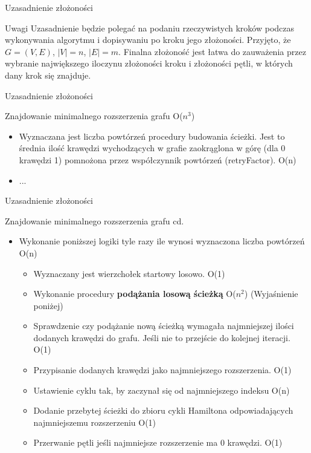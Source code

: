 \documentclass{beamer}
\begin{document}
\begin{frame}{Uzasadnienie złożoności}
\begin{block}{Uwagi}
\justifying
Uzasadnienie będzie polegać na podaniu rzeczywistych kroków podczas wykonywania algorytmu i dopisywaniu po kroku jego złożoności. Przyjęto, że $G = (V,E)$, $|V| = n$, $|E| = m$.
Finalna złożoność jest łatwa do zauważenia przez wybranie największego iloczynu złożoności kroku i złożoności pętli, w których dany krok się znajduje. 
\end{block}
\end{frame}

\begin{frame}{Uzasadnienie złożoności}
\begin{block}{Znajdowanie minimalnego rozszerzenia grafu O($n^3$)}
\justifying
\begin{itemize}
    \item Wyznaczana jest liczba powtórzeń procedury budowania ścieżki. Jest to średnia ilość krawędzi wychodzących w grafie zaokrąglona w górę (dla 0 krawędzi 1) pomnożona przez współczynnik powtórzeń (retryFactor). O(n)
    \item ...
\end{itemize}
\end{block}
\end{frame}

\begin{frame}{Uzasadnienie złożoności}
\begin{block}{Znajdowanie minimalnego rozszerzenia grafu cd.}
\justifying
\begin{itemize}
    \item Wykonanie poniższej logiki tyle razy ile wynosi wyznaczona liczba powtórzeń O(n)
    \begin{itemize}
        \item Wyznaczany jest wierzchołek startowy losowo. O(1)
        \item Wykonanie procedury \textbf{podążania losową ścieżką} O($n^2$) (Wyjaśnienie poniżej)
        \item Sprawdzenie czy podążanie nową ścieżką wymagała najmniejszej ilości dodanych krawędzi do grafu. Jeśli nie to przejście do kolejnej iteracji. O(1)
        \item Przypisanie dodanych krawędzi jako najmniejszego rozszerzenia. O(1)
        \item Ustawienie cyklu tak, by zaczynał się od najmniejszego indeksu O(n)
        \item Dodanie przebytej ścieżki do zbioru cykli Hamiltona odpowiadających najmniejszemu rozszerzeniu O(1)
        \item Przerwanie pętli jeśli najmniejsze rozszerzenie ma 0 krawędzi. O(1)
    \end{itemize}
\end{itemize}
\end{block}
\end{frame}
\end{document}
